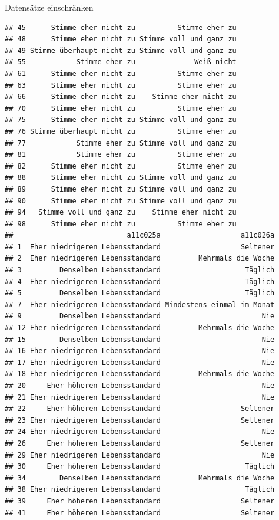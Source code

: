 \documentclass[ignorenonframetext,]{beamer}
\begin{document}
\begin{frame}[fragile]{Datensätze einschränken}
\begin{verbatim}
## 45      Stimme eher nicht zu          Stimme eher zu
## 48      Stimme eher nicht zu Stimme voll und ganz zu
## 49 Stimme überhaupt nicht zu Stimme voll und ganz zu
## 55            Stimme eher zu              Weiß nicht
## 61      Stimme eher nicht zu          Stimme eher zu
## 63      Stimme eher nicht zu          Stimme eher zu
## 66      Stimme eher nicht zu    Stimme eher nicht zu
## 70      Stimme eher nicht zu          Stimme eher zu
## 75      Stimme eher nicht zu Stimme voll und ganz zu
## 76 Stimme überhaupt nicht zu          Stimme eher zu
## 77            Stimme eher zu Stimme voll und ganz zu
## 81            Stimme eher zu          Stimme eher zu
## 82      Stimme eher nicht zu          Stimme eher zu
## 88      Stimme eher nicht zu Stimme voll und ganz zu
## 89      Stimme eher nicht zu Stimme voll und ganz zu
## 90      Stimme eher nicht zu Stimme voll und ganz zu
## 94   Stimme voll und ganz zu    Stimme eher nicht zu
## 98      Stimme eher nicht zu          Stimme eher zu
##                           a11c025a                   a11c026a
## 1  Eher niedrigeren Lebensstandard                   Seltener
## 2  Eher niedrigeren Lebensstandard         Mehrmals die Woche
## 3         Denselben Lebensstandard                    Täglich
## 4  Eher niedrigeren Lebensstandard                    Täglich
## 5         Denselben Lebensstandard                    Täglich
## 7  Eher niedrigeren Lebensstandard Mindestens einmal im Monat
## 9         Denselben Lebensstandard                        Nie
## 12 Eher niedrigeren Lebensstandard         Mehrmals die Woche
## 15        Denselben Lebensstandard                        Nie
## 16 Eher niedrigeren Lebensstandard                        Nie
## 17 Eher niedrigeren Lebensstandard                        Nie
## 18 Eher niedrigeren Lebensstandard         Mehrmals die Woche
## 20     Eher höheren Lebensstandard                        Nie
## 21 Eher niedrigeren Lebensstandard                        Nie
## 22     Eher höheren Lebensstandard                   Seltener
## 23 Eher niedrigeren Lebensstandard                   Seltener
## 24 Eher niedrigeren Lebensstandard                        Nie
## 26     Eher höheren Lebensstandard                   Seltener
## 29 Eher niedrigeren Lebensstandard                        Nie
## 30     Eher höheren Lebensstandard                    Täglich
## 34        Denselben Lebensstandard         Mehrmals die Woche
## 38 Eher niedrigeren Lebensstandard                    Täglich
## 39     Eher höheren Lebensstandard                   Seltener
## 41     Eher höheren Lebensstandard                   Seltener

\end{verbatim}
\end{frame}
\end{document}
